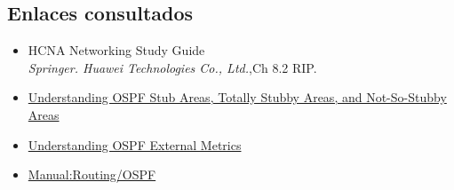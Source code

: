\documentclass[letterpaper,12pt]{article}
\begin{document}
	\subsection{Enlaces consultados}
		\begin{itemize}
			\item{HCNA Networking Study Guide}  \\
			\textit{Springer. Huawei Technologies Co., Ltd.},Ch 8.2 RIP.
			\item \href{https://www.juniper.net/documentation/en_US/junos/topics/concept/ospf-stub-áreas-overview.html}
			{Understanding OSPF Stub Areas, Totally Stubby Areas, and Not-So-Stubby Areas}
			\item \href{https://www.juniper.net/documentation/en_US/junos/topics/concept/ospf-routing-external-metrics-overview.html} 
			{Understanding OSPF External Metrics}
			\item \href{https://wiki.mikrotik.com/wiki/Manual:Routing/OSPF}
			{Manual:Routing/OSPF}

		\end{itemize}
\end{document}
